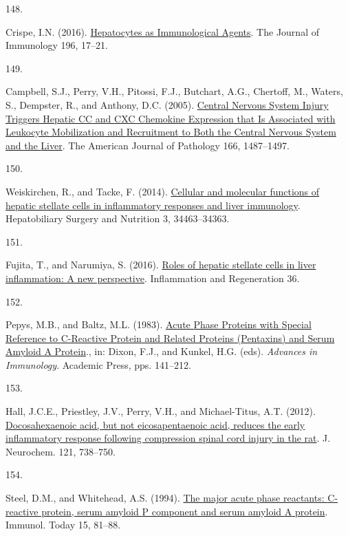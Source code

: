 \documentclass[
]{article}
\newlength{\cslhangindent}
\newlength{\csllabelwidth}
\newlength{\cslentryspacingunit} %
\newenvironment{CSLReferences}[2] %
 {%
  \setlength{\parindent}{0pt}
  \ifodd #1
  \let\oldpar\par
  \def\par{\hangindent=\cslhangindent\oldpar}
  \fi
  \setlength{\parskip}{#2\cslentryspacingunit}
 }%
 {}
\newcommand{\CSLLeftMargin}[1]{\parbox[t]{\csllabelwidth}{#1}}
\newcommand{\CSLRightInline}[1]{\parbox[t]{\linewidth - \csllabelwidth}{#1}\break}
\begin{document}
\begin{CSLReferences}{0}{0}
\leavevmode{}%
\CSLLeftMargin{148. }
\CSLRightInline{Crispe, I.N. (2016). \href{https://doi.org/10.4049/jimmunol.1501668}{Hepatocytes as {Immunological Agents}}. The Journal of Immunology 196, 17--21.}

\leavevmode{}%
\CSLLeftMargin{149. }
\CSLRightInline{Campbell, S.J., Perry, V.H., Pitossi, F.J., Butchart, A.G., Chertoff, M., Waters, S., Dempster, R., and Anthony, D.C. (2005). \href{https://doi.org/10.1016/S0002-9440(10)62365-6}{Central {Nervous System Injury Triggers Hepatic CC} and {CXC Chemokine Expression} that {Is Associated} with {Leukocyte Mobilization} and {Recruitment} to {Both} the {Central Nervous System} and the {Liver}}. The American Journal of Pathology 166, 1487--1497.}

\leavevmode{}%
\CSLLeftMargin{150. }
\CSLRightInline{Weiskirchen, R., and Tacke, F. (2014). \href{https://doi.org/10.3978/j.issn.2304-3881.2014.11.03}{Cellular and molecular functions of hepatic stellate cells in inflammatory responses and liver immunology}. Hepatobiliary Surgery and Nutrition 3, 34463--34363.}

\leavevmode{}%
\CSLLeftMargin{151. }
\CSLRightInline{Fujita, T., and Narumiya, S. (2016). \href{https://doi.org/10.1186/s41232-016-0005-6}{Roles of hepatic stellate cells in liver inflammation: A new perspective}. Inflammation and Regeneration 36.}

\leavevmode{}%
\CSLLeftMargin{152. }
\CSLRightInline{Pepys, M.B., and Baltz, M.L. (1983). \href{https://doi.org/10.1016/S0065-2776(08)60379-X}{Acute {Phase Proteins} with {Special Reference} to {C-Reactive Protein} and {Related Proteins} ({Pentaxins}) and {Serum Amyloid A Protein}}., in: Dixon, F.J., and Kunkel, H.G. (eds). \emph{Advances in {Immunology}}. {Academic Press}, pps. 141--212.}

\leavevmode{}%
\CSLLeftMargin{153. }
\CSLRightInline{Hall, J.C.E., Priestley, J.V., Perry, V.H., and Michael-Titus, A.T. (2012). \href{https://doi.org/10.1111/j.1471-4159.2012.07726.x}{Docosahexaenoic acid, but not eicosapentaenoic acid, reduces the early inflammatory response following compression spinal cord injury in the rat}. J. Neurochem. 121, 738--750.}

\leavevmode{}%
\CSLLeftMargin{154. }
\CSLRightInline{Steel, D.M., and Whitehead, A.S. (1994). \href{https://doi.org/10.1016/0167-5699(94)90138-4}{The major acute phase reactants: {C-reactive} protein, serum amyloid {P} component and serum amyloid {A} protein}. Immunol. Today 15, 81--88.}


\end{CSLReferences}
\end{document}
